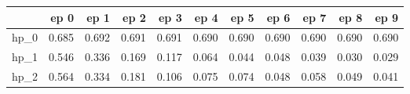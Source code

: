 \begin{tabular}{lrrrrrrrrrr}
\toprule
{} &   ep 0 &   ep 1 &   ep 2 &   ep 3 &   ep 4 &   ep 5 &   ep 6 &   ep 7 &   ep 8 &   ep 9 \\
\midrule
hp\_0 &  0.685 &  0.692 &  0.691 &  0.691 &  0.690 &  0.690 &  0.690 &  0.690 &  0.690 &  0.690 \\
hp\_1 &  0.546 &  0.336 &  0.169 &  0.117 &  0.064 &  0.044 &  0.048 &  0.039 &  0.030 &  0.029 \\
hp\_2 &  0.564 &  0.334 &  0.181 &  0.106 &  0.075 &  0.074 &  0.048 &  0.058 &  0.049 &  0.041 \\
\bottomrule
\end{tabular}
